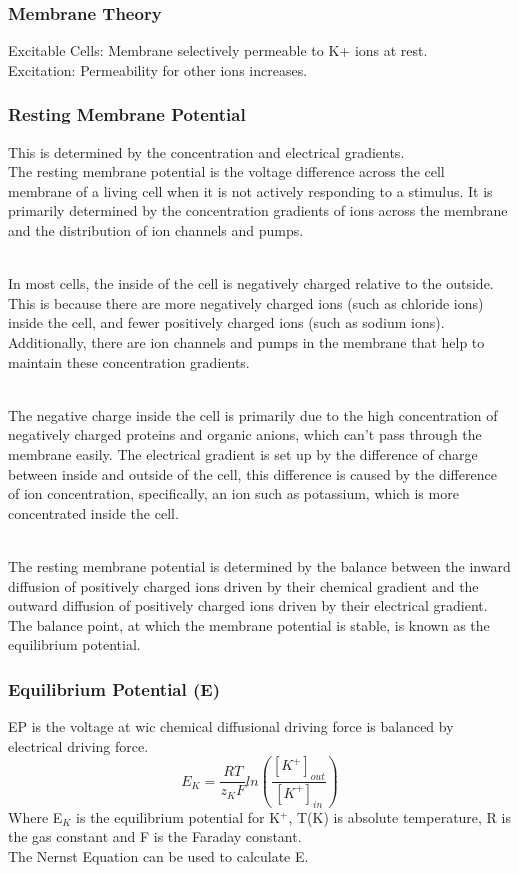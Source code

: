 \begin{itemize}
\subsubsection{Membrane Theory}
Excitable Cells: Membrane selectively permeable to K+ ions at rest.
\\Excitation: Permeability for other ions increases.
\subsubsection{Resting Membrane Potential}
This is determined by the concentration and electrical gradients.
\\The resting membrane potential is the voltage difference across the cell membrane of a living cell when it is not actively responding to a stimulus. It is primarily determined by the concentration gradients of ions across the membrane and the distribution of ion channels and pumps.

\\In most cells, the inside of the cell is negatively charged relative to the outside. This is because there are more negatively charged ions (such as chloride ions) inside the cell, and fewer positively charged ions (such as sodium ions). Additionally, there are ion channels and pumps in the membrane that help to maintain these concentration gradients.

\\The negative charge inside the cell is primarily due to the high concentration of negatively charged proteins and organic anions, which can't pass through the membrane easily. The electrical gradient is set up by the difference of charge between inside and outside of the cell, this difference is caused by the difference of ion concentration, specifically, an ion such as potassium, which is more concentrated inside the cell.

\\The resting membrane potential is determined by the balance between the inward diffusion of positively charged ions driven by their chemical gradient and the outward diffusion of positively charged ions driven by their electrical gradient. The balance point, at which the membrane potential is stable, is known as the equilibrium potential.

\subsubsection{Equilibrium Potential (E)}
EP is the voltage at wic chemical diffusional driving force is balanced by electrical driving force.
\[E_{K} = \frac{RT}{z_{K}F}ln(\frac{[K^{+}]_{out}}{[K^{+}]_{in}})\]
Where E$_{K}$ is the equilibrium potential for K$^{+}$, T(K) is absolute temperature, R is the gas constant and F is the Faraday constant.
\\The Nernst Equation can be used to calculate E.

\end{itemize}
